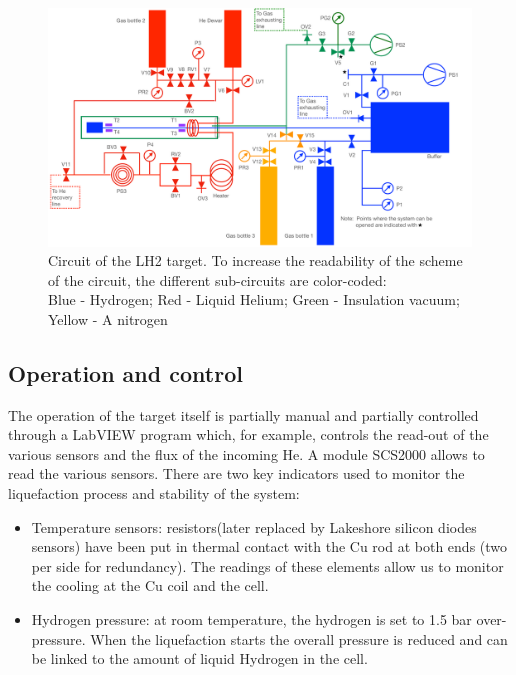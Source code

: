 \begin{refsection}
    \begin{figure}
        \centering
        \includegraphics[width=\textwidth]{Figures/LH2/2021/2021_LH2_circuit.png}
        \caption{Circuit of the LH2 target. To increase the readability of the scheme of the circuit, the different sub-circuits are color-coded:\\ Blue - Hydrogen; Red - Liquid Helium; Green - Insulation vacuum; Yellow - A nitrogen}
    \label{fig:LH2:2021:circuit}
    \end{figure}

    \subsection{Operation and control}
        The operation of the target itself is partially manual and partially controlled through a LabVIEW program which, for example, controls the read-out of the various sensors and the flux of the incoming He. 
        A module SCS2000 allows to read the various sensors. 
        There are two key indicators used to monitor the liquefaction process and stability of the system:
    
        \begin{itemize}
            \item Temperature sensors: resistors(later replaced by Lakeshore silicon diodes sensors) have been put in thermal contact with the Cu rod at both ends (two per side for redundancy). 
            The readings of these elements allow us to monitor the cooling at the Cu coil and the cell.
            \item Hydrogen pressure: at room temperature, the hydrogen is set to 1.5 bar over-pressure. When the liquefaction starts the overall pressure is reduced and can be linked to the amount of liquid Hydrogen in the cell. 
        \end{itemize}


\end{refsection}
